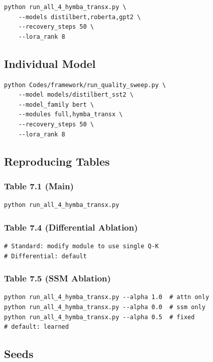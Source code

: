 \begin{lstlisting}
python run_all_4_hymba_transx.py \
    --models distilbert,roberta,gpt2 \
    --recovery_steps 50 \
    --lora_rank 8
\end{lstlisting}

\subsection{Individual Model}

\begin{lstlisting}
python Codes/framework/run_quality_sweep.py \
    --model models/distilbert_sst2 \
    --model_family bert \
    --modules full,hymba_transx \
    --recovery_steps 50 \
    --lora_rank 8
\end{lstlisting}

\subsection{Reproducing Tables}

\subsubsection{Table 7.1 (Main)}
\begin{lstlisting}
python run_all_4_hymba_transx.py
\end{lstlisting}

\subsubsection{Table 7.4 (Differential Ablation)}
\begin{lstlisting}
# Standard: modify module to use single Q-K
# Differential: default
\end{lstlisting}

\subsubsection{Table 7.5 (SSM Ablation)}
\begin{lstlisting}
python run_all_4_hymba_transx.py --alpha 1.0  # attn only
python run_all_4_hymba_transx.py --alpha 0.0  # ssm only
python run_all_4_hymba_transx.py --alpha 0.5  # fixed
# default: learned
\end{lstlisting}

\subsection{Seeds}

